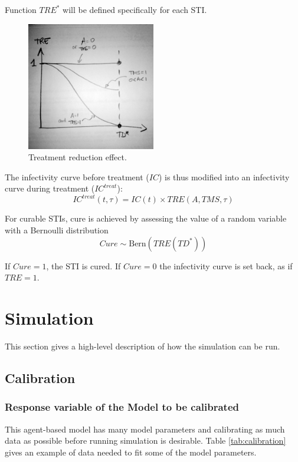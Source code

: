 \documentclass[11pt, onecolumn]{article}
\begin{document}
Function $TRE^*$ will be defined specifically for each STI.

\begin{figure}[!ht]
\centering
    \includegraphics[angle=0,width=0.5\textwidth]{figures/TRE.JPG}
\caption{Treatment reduction effect.}
\label{fig:TRE}
\end{figure}

The infectivity curve before treatment ($IC$) is thus modified into an infectivity curve during treatment ($IC^{treat}$):
$$IC^{treat}(t,\tau)= IC(t)\times TRE(A,TMS,\tau)  $$

For curable STIs, cure is achieved by assessing the value of a random variable with a Bernoulli distribution 
$$Cure \sim \mathrm{Bern}(TRE(TD^*)) $$

If $Cure=1$, the STI is cured. If $Cure=0$ the infectivity curve is set back, as if $TRE=1$.





\section{Simulation}

This section gives a high-level description of how the simulation can be run. 

\subsection{Calibration}

\subsubsection{Response variable of the Model to be calibrated}

This agent-based model has many model parameters and calibrating as much data as possible before running simulation is desirable. Table \ref{tab:calibration} gives an example of data needed to fit some of the model parameters.
\end{document}
